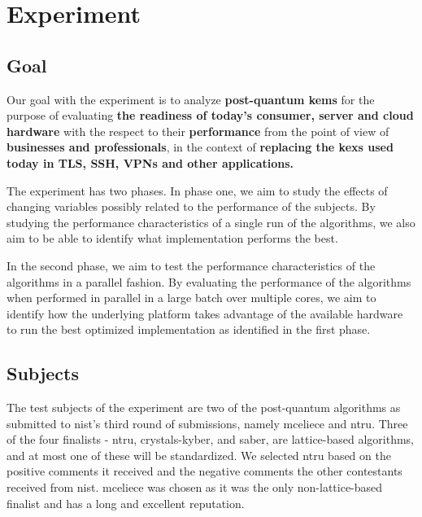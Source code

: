 \section{Experiment}
\label{section:method:experiment}

\subsection{Goal}
\label{section:method:experiment:goal}

Our goal with the experiment is to analyze \textbf{\gls{post-quantum} \glspl{kem}} for the purpose of evaluating \textbf{the readiness of today's consumer, server and cloud hardware} with the respect to their \textbf{performance} from the point of view of \textbf{businesses and professionals}, in the context of \textbf{replacing the \glspl{kex} used today in TLS, SSH, VPNs and other applications.}

The experiment has two phases. In phase one, we aim to study the effects of changing variables possibly related to the performance of the subjects. By studying the performance characteristics of a single run of the algorithms, we also aim to be able to identify what implementation performs the best.

In the second phase, we aim to test the performance characteristics of the algorithms in a parallel fashion. By evaluating the performance of the algorithms when performed in parallel in a large batch over multiple cores, we aim to identify how the underlying platform takes advantage of the available hardware to run the best optimized implementation as identified in the first phase.

\subsection{Subjects}
\label{section:method:experiment:subjects}

The test subjects of the experiment are two of the post-quantum algorithms as submitted to \gls{nist}'s third round of submissions, namely \gls{mceliece} and \gls{ntru}. Three of the four finalists - \gls{ntru}, \gls{crystals-kyber}, and \gls{saber}, are lattice-based algorithms, and at most one of these will be standardized. We selected \gls{ntru} based on the positive comments it received and the negative comments the other contestants received from \gls{nist}. \gls{mceliece} was chosen as it was the only non-lattice-based finalist and has a long and excellent reputation\cite{nist2020}.

